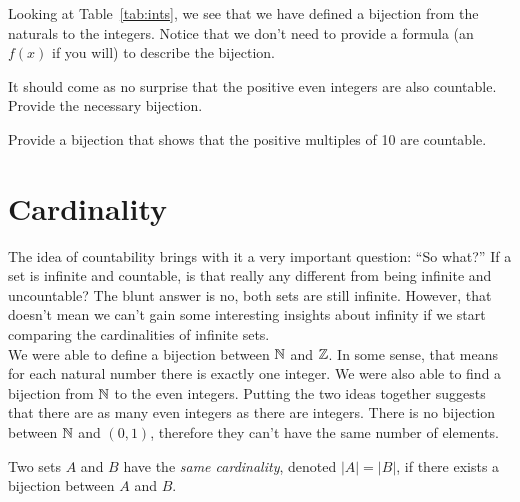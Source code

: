 Looking at Table~\ref{tab:ints}, we see that we have defined a bijection from the naturals to the integers.  Notice that we don't need to provide a formula (an $f(x)$ if you will) to describe the bijection.

\begin{question}[resume]
\item It should come as no surprise that the positive even integers are also countable.  Provide the necessary bijection.

\vspace{2in}
\item Provide a bijection that shows that the positive multiples of 10 are countable.

\vspace{2in}
\end{question}

\section{Cardinality}

The idea of countability brings with it a very important question: ``So what?''  If a set is infinite and countable, is that really any different from being infinite and uncountable?  The blunt answer is no, both sets are still infinite.  However, that doesn't mean we can't gain some interesting insights about infinity if we start comparing the cardinalities of infinite sets.\\

We were able to define a bijection between $\mathbb{N}$ and $\mathbb{Z}$.  In some sense, that means for each natural number there is exactly one integer.  We were also able to find a bijection from $\mathbb{N}$ to the even integers.  Putting the two ideas together suggests that there are as many even integers as there are integers.  There is no bijection between $\mathbb{N}$ and $(0,1)$, therefore they can't have the same number of elements.\\

\begin{definition}  Two sets $A$ and $B$ have the \textit{same cardinality}, denoted $|A|=|B|$, if there exists a bijection between $A$ and $B$.
\end{definition}

